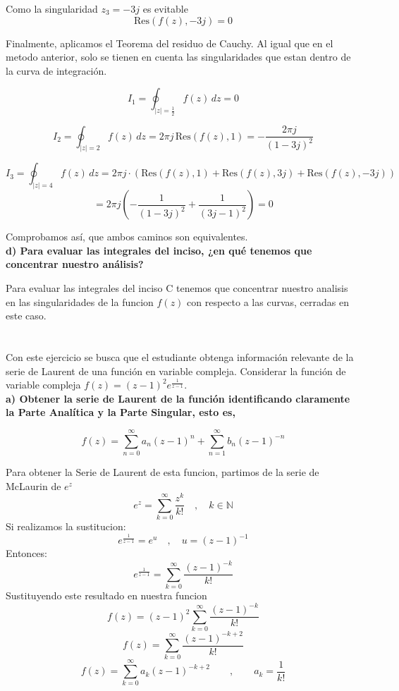 \documentclass[12pt,a4paper]{report}
\begin{document}
Como la singularidad $z_3 = -3j$ es evitable $$\text{Res}(f(z),-3j)=0$$

Finalmente, aplicamos el Teorema del residuo de Cauchy. Al igual que en el metodo anterior, solo se tienen en cuenta las singularidades que estan dentro
de la curva de integración.

$$I_1= \oint_{|z|=\frac{1}{2}}f(z) \, dz = 0 $$

$$I_2= \oint_{|z|=2}f(z) \, dz = 2 \pi j \, \text{Res}(f(z),1)= -\frac{2 \pi j}{(1-3j)^2}$$

$$I_3= \oint_{|z|=4}f(z) \, dz = 2 \pi j \cdot (\text{Res}(f(z),1)+\text{Res}(f(z),3j)+\text{Res}(f(z),-3j))$$
$$=2\pi j \left( -\frac{1}{(1-3j)^2} + \frac{1}{(3j-1)^2} \right)=0$$

Comprobamos así, que ambos caminos son equivalentes.\\

\textbf{d) Para evaluar las integrales del inciso, ¿en qué tenemos que concentrar nuestro análisis?}

Para evaluar las integrales del inciso C tenemos que concentrar nuestro analisis en las singularidades de la funcion $f(z)$ con respecto a las curvas,
cerradas en este caso.\\

\chapter{}%

Con este ejercicio se busca que el estudiante obtenga información relevante de la serie de Laurent de una función en variable compleja.
Considerar la función de variable compleja $ f(z) = (z - 1)^2 e^\frac{1}{z - 1} $.\\[6pt]

\textbf{a)  Obtener la serie de Laurent de la función identificando claramente la Parte Analítica y la Parte Singular, esto es,}

$$ f(z) = \sum_{n=0}^{\infty} a_n(z - 1)^n + \sum_{n=1}^{\infty} b_n(z - 1)^{-n} $$

Para obtener la Serie de Laurent de esta funcion, partimos de la serie de McLaurin de $e^z$
$$e^z=\sum_{k=0}^{\infty}\frac{z^k}{k!}\quad,\quad k \in \mathbb{N}$$
Si realizamos la sustitucion:
$$e^\frac{1}{z - 1}=e^u \quad, \quad u=(z - 1)^{-1}$$
Entonces:
$$e^\frac{1}{z - 1}=\sum_{k=0}^{\infty}\frac{(z - 1)^{-k}}{k!}$$
Sustituyendo este resultado en nuestra funcion
$$f(z) = (z - 1)^2 \sum_{k=0}^{\infty}\frac{(z - 1)^{-k}}{k!}$$
$$f(z) = \sum_{k=0}^{\infty}\frac{(z - 1)^{-k+2}}{k!}$$
$$f(z) = \sum_{k=0}^{\infty}a_k(z - 1)^{-k+2}\qquad, \qquad a_k=\frac{1}{k!}$$
\end{document}
